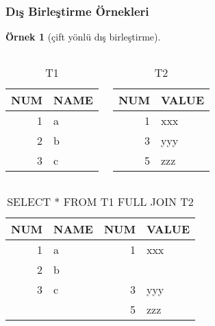 \documentclass[dvipsnames]{beamer}
\theoremstyle{definition}
\theoremstyle{example}
\newtheorem{ornek}[theorem]{Örnek}
\theoremstyle{plain}
\begin{document}
\begin{frame}[fragile]
  \frametitle{Dış Birleştirme Örnekleri}

  \begin{ornek}[çift yönlü dış birleştirme]
    \begin{columns}[t]
      \begin{tiny}
      \begin{table}
        \caption{T1}
        \begin{tabular}{|r|l|}\hline
NUM & NAME\\\hline\hline
  1 & a   \\\hline
  2 & b   \\\hline
  3 & c   \\\hline
        \end{tabular}
      \end{table}
      \end{tiny}

      \begin{tiny}
      \begin{table}
        \caption{T2}
        \begin{tabular}{|r|l|}\hline
NUM & VALUE\\\hline\hline
  1 & xxx  \\\hline
  3 & yyy  \\\hline
  5 & zzz  \\\hline
        \end{tabular}
      \end{table}
      \end{tiny}
    \end{columns}

    \pause
    \begin{center}
      \begin{tiny}
      \begin{table}
        \caption{SELECT * FROM T1 FULL JOIN T2}
        \begin{tabular}{|r|l|r|l|}\hline
NUM & NAME & NUM & VALUE\\\hline\hline
  1 & a    &   1 & xxx  \\\hline
  2 & b    &     &      \\\hline
  3 & c    &   3 & yyy  \\\hline
    &      &   5 & zzz  \\\hline
        \end{tabular}
      \end{table}
      \end{tiny}
    \end{center}
  \end{ornek}
\end{frame}
\end{document}
